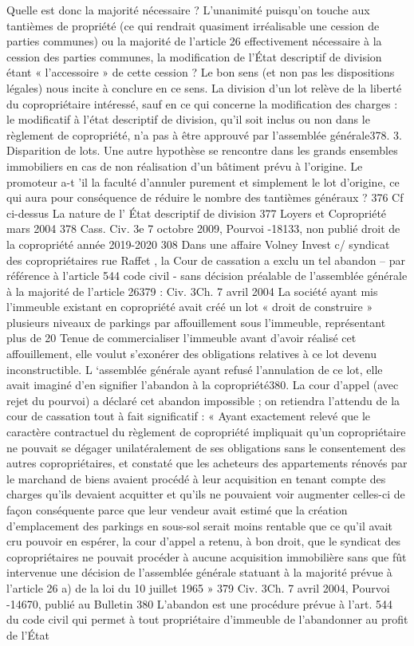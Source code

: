 		Quelle est donc la majorité nécessaire ? L’unanimité puisqu’on touche aux tantièmes de propriété (ce qui rendrait quasiment irréalisable une cession de parties communes) ou la majorité de l’article 26 effectivement nécessaire à la cession des parties communes, la modification de l’État descriptif de division étant « l’accessoire » de cette cession ? Le bon sens (et non pas les dispositions légales) nous incite à conclure en ce sens.
		La division d’un lot relève de la liberté du copropriétaire intéressé, sauf en ce qui concerne la modification des charges : le modificatif à l’état descriptif de division, qu’il soit inclus ou non dans le règlement de copropriété, n’a pas à être approuvé par l’assemblée générale378.
		3. Disparition de lots.
		Une autre hypothèse se rencontre dans les grands ensembles immobiliers en cas de non réalisation d'un bâtiment prévu à l'origine.
		Le promoteur a-t ’il la faculté d'annuler purement et simplement le lot d'origine, ce qui aura pour conséquence de réduire le nombre des tantièmes généraux ?
		376 Cf ci-dessus La nature de l’ État descriptif de division
		377 Loyers et Copropriété mars 2004 
		378 Cass. Civ. 3e 7 octobre 2009, Pourvoi -18133, non publié
		droit de la copropriété année 2019-2020
		308
		Dans une affaire Volney Invest c/ syndicat des copropriétaires rue Raffet , la Cour de cassation a exclu un tel abandon – par référence à l’article 544 code civil - sans décision préalable de l’assemblée générale à la majorité de l’article 26379 :
		Civ. 3\degres Ch. 7 avril 2004
		La société ayant mis l’immeuble existant en copropriété avait créé un lot « droit de construire » plusieurs niveaux de parkings par affouillement sous l’immeuble, représentant plus de 20 %
		Tenue de commercialiser l’immeuble avant d’avoir réalisé cet affouillement, elle voulut s’exonérer des obligations relatives à ce lot devenu inconstructible. L ‘assemblée générale ayant refusé l’annulation de ce lot, elle avait imaginé d’en signifier l’abandon à la copropriété380.
		La cour d’appel (avec rejet du pourvoi) a déclaré cet abandon impossible ; on retiendra l’attendu de la cour de cassation tout à fait significatif :
		« Ayant exactement relevé que le caractère contractuel du règlement de copropriété impliquait qu'un copropriétaire ne pouvait se dégager unilatéralement de ses obligations sans le consentement des autres copropriétaires, et constaté que les acheteurs des appartements rénovés par le marchand de biens avaient procédé à leur acquisition en tenant compte des charges qu'ils devaient acquitter et qu'ils ne pouvaient voir augmenter celles-ci de façon conséquente parce que leur vendeur avait estimé que la création d'emplacement des parkings en sous-sol serait moins rentable que ce qu'il avait cru pouvoir en espérer, la cour d'appel a retenu, à bon droit, que le syndicat des copropriétaires ne pouvait procéder à aucune acquisition immobilière sans que fût intervenue une décision de l'assemblée générale statuant à la majorité prévue à l'article 26 a) de la loi du 10 juillet 1965 »
		379 Civ. 3\degres Ch. 7 avril 2004, Pourvoi -14670, publié au Bulletin
		380 L’abandon est une procédure prévue à l’art. 544 du code civil qui permet à tout propriétaire d’immeuble de l’abandonner au profit de l’État